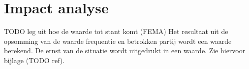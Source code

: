 \chapter{Impact analyse}
\label{app:impact_analyse}

TODO leg uit hoe de waarde tot stant komt (FEMA)
Het resultaat uit de opsomming van de waarde frequentie en betrokken partij wordt een waarde berekend. 
De ernst van de situatie wordt uitgedrukt in een waarde. Zie hiervoor bijlage (TODO ref).

